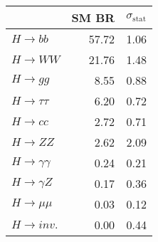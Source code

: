 \begin{tabular}{lrr}
\toprule
{} &  SM BR &  $\sigma_{\mathrm{stat}}$ \\
\midrule
$H \to bb$            &  57.72 &                      1.06 \\
$H \to WW$            &  21.76 &                      1.48 \\
$H \to gg$            &   8.55 &                      0.88 \\
$H \to \tau \tau$     &   6.20 &                      0.72 \\
$H \to cc$            &   2.72 &                      0.71 \\
$H \to ZZ$            &   2.62 &                      2.09 \\
$H \to \gamma \gamma$ &   0.24 &                      0.21 \\
$H \to \gamma Z$      &   0.17 &                      0.36 \\
$H \to \mu \mu$       &   0.03 &                      0.12 \\
$H \to inv.$          &   0.00 &                      0.44 \\
\bottomrule
\end{tabular}
